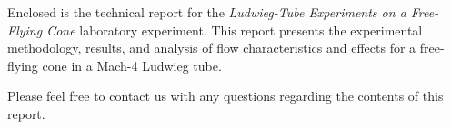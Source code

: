 


\usepackage{cleveref}

\fancyhead[C]{}
\fancyheadwidth[L]{0.5\headwidth}
\fancyheadwidth[C]{0.0\headwidth}
\fancyheadwidth[R]{0.5\headwidth}







\hypertarget{titlepage}{\maketitle}
\thispagestyle{empty}

\pagebreak


\thispagestyle{empty}

\DTMtoday

\vspace{5.0ex}

Enclosed is the technical report for the \textit{Ludwieg-Tube Experiments on a Free-Flying Cone} laboratory experiment. This report presents the experimental methodology, results, and analysis of flow characteristics and effects for a free-flying cone in a Mach-4 Ludwieg tube.

Please feel free to contact us with any questions regarding the contents of this report.

\vspace{5.0ex}

